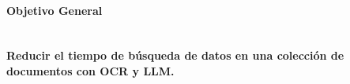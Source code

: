 \documentclass[../main.tex]{subfiles}
\begin{document}
%
%



\paragraph{Objetivo General} \hspace{0pt} \\
\textbf{Reducir el tiempo de búsqueda de datos en una colección de documentos con OCR y LLM.}

\end{document}
